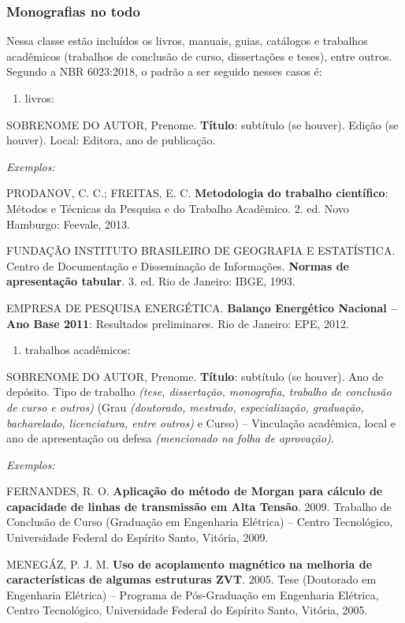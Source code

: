 \documentclass[10pt,a4paper]{article}
\newenvironment{referencias}
  {\begin{list}{}{\setlength{\leftmargin}{2.2em}\setlength{\itemsep}{\baselineskip}
     \setlength{\parsep}{0pt}\setlength{\topsep}{4pt}}
   \singlespacing\raggedright\sloppy}
  {\end{list}}
\newcommand{\referencia}{\item[]}
\newcommand{\exemplos}{\item[]{\itshape Exemplos:}\vspace{-\baselineskip}}
\begin{document}
\subsubsection*{Monografias no todo}
Nessa classe estão incluídos os livros, manuais, guias, catálogos e trabalhos acadêmicos (trabalhos de conclusão de curso, dissertações e teses), entre outros. Segundo a NBR 6023:2018, o padrão a ser seguido nesses casos é:
\begin{enumerate}
  \item livros:
\end{enumerate}
\begin{referencias}
  \referencia SOBRENOME DO AUTOR, Prenome. \textbf{Título}: subtítulo (se houver). Edição (se houver). Local: Editora, ano de publicação.
  \exemplos
  \referencia PRODANOV, C. C.; FREITAS, E. C. \textbf{Metodologia do trabalho científico}: Métodos e Técnicas da Pesquisa e do Trabalho Acadêmico. 2. ed. Novo Hamburgo: Feevale, 2013.
  \referencia FUNDAÇÃO INSTITUTO BRASILEIRO DE GEOGRAFIA E ESTATÍSTICA. Centro de Documentação e Disseminação de Informações. \textbf{Normas de apresentação tabular}. 3. ed. Rio de Janeiro: IBGE, 1993.
  \referencia EMPRESA DE PESQUISA ENERGÉTICA. \textbf{Balanço Energético Nacional -- Ano Base 2011}: Resultados preliminares. Rio de Janeiro: EPE, 2012.
\end{referencias}
\begin{enumerate}[resume]
  \item trabalhos acadêmicos:
\end{enumerate}
\begin{referencias}
  \referencia SOBRENOME DO AUTOR, Prenome. \textbf{Título}: subtítulo (se houver). Ano de depósito. Tipo de trabalho \textit{(tese, dissertação, monografia, trabalho de conclusão de curso e outros)} (Grau \textit{(doutorado, mestrado, especialização, graduação, bacharelado, licenciatura, entre outros)} e Curso) -- Vinculação acadêmica, local e ano de apresentação ou defesa \textit{(mencionado na folha de aprovação)}.
  \exemplos
  \referencia FERNANDES, R. O. \textbf{Aplicação do método de Morgan para cálculo de capacidade de linhas de transmissão em Alta Tensão}. 2009. Trabalho de Conclusão de Curso (Graduação em Engenharia Elétrica) -- Centro Tecnológico, Universidade Federal do Espírito Santo, Vitória, 2009.
  \referencia MENEGÁZ, P. J. M. \textbf{Uso de acoplamento magnético na melhoria de características de algumas estruturas ZVT}. 2005. Tese (Doutorado em Engenharia Elétrica) -- Programa de Pós-Graduação em Engenharia Elétrica, Centro Tecnológico, Universidade Federal do Espírito Santo, Vitória, 2005.
\end{referencias}
\end{document}

